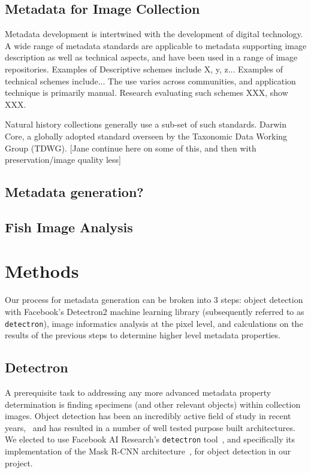 \documentclass[screen,review]{acmart}
\begin{document}
\subsection{Metadata for Image Collection}
Metadata development is intertwined with the development of digital technology. A wide range of metadata standards are applicable to metadata supporting image description as well as technical aspects, and have been used in a range of image repositories. Examples of Descriptive schemes include X, y, z... Examples of technical schemes include... The use varies across communities, and application technique is primarily manual. Research evaluating such schemes XXX, show XXX. 

Natural history collections generally use a sub-set of such standards. Darwin Core, a globally adopted standard overseen by the Taxonomic Data Working Group (TDWG).  [Jane continue here on some of this, and then with preservation/image quality less]

\subsection{Metadata generation?}

\subsection{Fish Image Analysis}

\cite{BockAlexander2018TITE}
\cite{KonovalovD2017RDfA}
\cite{Williams:2020:UIF}

\section{Methods}
Our process for metadata generation can be broken into 3 steps: object detection with Facebook's Detectron2 machine learning library (subsequently referred to as \verb|detectron|), image informatics analysis at the pixel level, and calculations on the results of the previous steps to determine higher level metadata properties.

\subsection{Detectron}
A prerequisite task to addressing any more advanced metadata property determination is finding specimens (and other relevant objects) within collection images. Object detection has been an incredibly active field of study in recent years,~\cite{zou2019object} and has resulted in a number of well tested purpose built architectures. We elected to use Facebook AI Research's \verb|detectron| tool~\cite{wu2019detectron2}, and specifically its implementation of the Mask R-CNN architecture~\cite{he2018mask}, for object detection in our project.
\end{document}
